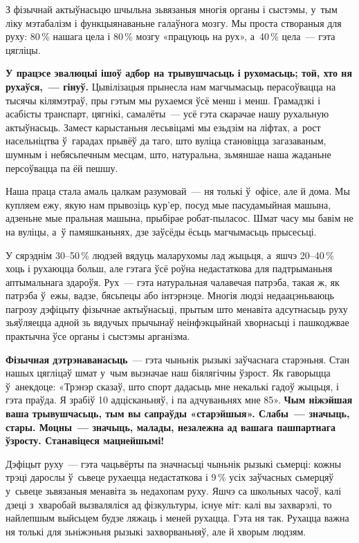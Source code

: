 З фізычнай актыўнасьцю шчыльна зьвязаныя многія органы і сыстэмы, у~тым ліку мэтабалізм і функцыянаваньне галаўнога мозгу. Мы проста створаныя для руху: 80\,\% нашага цела і 80\,\% мозгу «працуюць на рух», а~40\,\% цела~--- гэта цягліцы.

\textbf{У працэсе эвалюцыі ішоў адбор на трывушчасьць і рухомасьць; той, хто ня рухаўся,~--- гінуў.} Цывілізацыя прынесла нам магчымасьць перасоўвацца на тысячы кілямэтраў, пры гэтым мы рухаемся ўсё менш і менш. Грамадзкі і асабісты транспарт, цягнікі, самалёты~--- усё гэта скарачае нашу рухальную актыўнасьць. Замест карыстаньня лесьвіцамі мы езьдзім на ліфтах, а~рост насельніцтва ў~гарадах прывёў да таго, што вуліца становіцца загазаваным, шумным і небясьпечным месцам, што, натуральна, зьмяншае наша жаданьне персоўвацца па ёй пешшу.

Наша праца стала амаль цалкам разумовай~--- ня толькі ў~офісе, але й дома. Мы купляем ежу, якую нам прывозіць кур'ер, посуд мые пасудамыйная машына, адзеньне мые пральная машына, прыбірае робат-пыласос. Шмат часу мы бавім не на вуліцы, а~ў памяшканьнях, дзе заўсёды ёсьць магчымасьць прысесьці. 


У сярэднім 30--50\,\% людзей вядуць маларухомы лад жыцьця, а~яшчэ 20--40\,\% хоць і рухаюцца больш, але гэтага ўсё роўна недастаткова для падтрыманьня аптымальнага здароўя. Рух~--- гэта натуральная чалавечая патрэба, такая ж, як патрэба ў~ежы, вадзе, бясьпецы або інтэрнэце. Многія людзі недаацэньваюць пагрозу дэфіцыту фізычнае актыўнасьці, прытым што менавіта адсутнасьць руху зьяўляецца адной зь вядучых прычынаў неінфэкцыйнай хворнасьці і пашкоджвае практычна ўсе органы і сыстэмы арганізма.

\textbf{Фізычная дэтрэнаванасьць}~--- гэта чыньнік рызыкі заўчаснага старэньня. Стан нашых цягліцаў шмат у~чым вызначае наш біялягічны ўзрост. Як гаворыцца ў~анекдоце: «Трэнэр сказаў, што спорт дадасьць мне некалькі гадоў жыцьця, і гэта праўда. Я зрабіў 10 адцісканьняў, і па адчуваньнях мне 85». \textbf{Чым ніжэйшая ваша трывушчасьць, тым вы сапраўды «старэйшыя». Слабы~--- значыць, стары. Моцны~--- значыць, малады, незалежна ад вашага пашпартнага ўзросту. Станавіцеся мацнейшымі!}

Дэфіцыт руху~--- гэта чацьвёрты па значнасьці чыньнік рызыкі сьмерці: кожны трэці дарослы ў~сьвеце рухаецца недастаткова і 9\,\% усіх заўчасных сьмерцяў у~сьвеце зьвязаныя менавіта зь недахопам руху. Яшчэ са школьных часоў, калі дзеці з~хваробай вызваляліся ад фізкультуры, існуе міт: калі вы захварэлі, то найлепшым выйсьцем будзе ляжаць і меней рухацца. Гэта ня так. Рухацца важна ня толькі для зьніжэньня рызыкі захворваньняў, але й хворым людзям.

